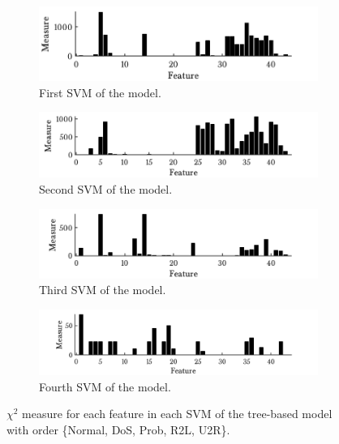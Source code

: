 \begin{figure}[h!]
        \begin{subfigure}[b]{.97\textwidth}  
            \centering 
            \includegraphics[width=.98\textwidth]{parts/chap-4/img-svm/nl-chi2/svm3.png}
            \caption{First SVM of the model.} 
        \end{subfigure}
        \vfill
         \begin{subfigure}[b]{.97\textwidth}  
            \centering 
            \includegraphics[width=.98\textwidth]{parts/chap-4/img-svm/nl-chi2/svm2.png}
            \caption{Second SVM of the model.} 
        \end{subfigure}
        \vfill
         \begin{subfigure}[b]{.97\textwidth}  
            \centering 
            \includegraphics[width=.98\textwidth]{parts/chap-4/img-svm/nl-chi2/svm4.png}
            \caption{Third SVM of the model.} 
        \end{subfigure}
        \vfill
         \begin{subfigure}[b]{.97\textwidth}  
            \centering 
            \includegraphics[width=.98\textwidth]{parts/chap-4/img-svm/nl-chi2/svm1.png}
            \caption{Fourth SVM of the model.} 
        \end{subfigure}
        \caption[$\chi^2$ measure of each feature.]{$\chi^2$ measure for each feature in each SVM of the tree-based model with order \{Normal, DoS, Prob, R2L, U2R\}.}
        \label{fig:svm-nl-chi2}
\end{figure}

